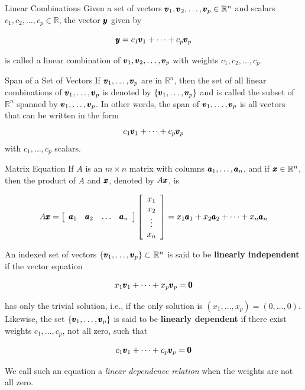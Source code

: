 \begin{definition}{Linear Combinations}
    Given a set of vectors $\pmb{v}_1, \pmb{v}_2, \ldots, \pmb{v}_p \in \mathbb{R}^n$ and scalars $c_1, c_2, \ldots, c_p \in \mathbb{R}$, the vector $\pmb{y}$ given by

\[
\pmb{y} = c_1 \pmb{v}_1 + \cdots + c_p \pmb{v}_p
\]

is called a linear combination of $\pmb{v}_1, \pmb{v}_2, \ldots, \pmb{v}_p$ with weights $c_1, c_2, \ldots, c_p$.

\end{definition}

\begin{definition}{Span of a Set of Vectors}
    If $\pmb{v}_1, \ldots, \pmb{v}_p$ are in $\mathbb{R}^n$, then the set of all linear combinations of $\pmb{v}_1, \ldots, \pmb{v}_p$ is denoted by  $\left\{\pmb{v}_1, \ldots, \pmb{v}_p\right\}$ and is called the subset of $\mathbb{R}^n$ spanned by $\pmb{v}_1, \ldots, \pmb{v}_p$. In other words, the span of $\pmb{v}_1, \ldots, \pmb{v}_p$ is all vectors that can be written in the form
    $$
    c_1 \pmb{v}_1 + \cdots + c_p \pmb{v}_p
    $$
    with $c_1, \ldots, c_p$ scalars.

\end{definition}

\begin{definition}{Matrix Equation}
  If $A$ is an $m \times n$ matrix with columns $\pmb{a}_1, \ldots, \pmb{a}_n$, and if $\pmb{x} \in \mathbb{R}^n$, then the product of $A$ and $\pmb{x}$, denoted by $A \pmb{x}$, is

\[
A \pmb{x} = \left[\begin{array}{llll}
\pmb{a}_1 & \pmb{a}_2 & \ldots & \pmb{a}_n
\end{array}\right] \left[\begin{array}{c}
x_1 \\
x_2 \\
\vdots \\
x_n
\end{array}\right] = x_1 \pmb{a}_1 + x_2 \pmb{a}_2 + \cdots + x_n \pmb{a}_n
\]
    
\end{definition}

\begin{definition}
    An indexed set of vectors $\left\{\pmb{v}_1, \ldots, \pmb{v}_p\right\} \subset \mathbb{R}^n$ is said to be \textbf{linearly independent} if the vector equation
    
    \[
    x_1 \pmb{v}_1 + \cdots + x_p \pmb{v}_p = \pmb{0}
    \]
    
    has only the trivial solution, i.e., if the only solution is $\left(x_1, \ldots, x_p\right) = (0, \ldots, 0)$. Likewise, the set $\left\{\pmb{v}_1, \ldots, \pmb{v}_p\right\}$ is said to be \textbf{linearly dependent} if there exist weights $c_1, \ldots, c_p$, not all zero, such that
    
    \[
    c_1 \pmb{v}_1 + \cdots + c_p \pmb{v}_p = \pmb{0}
    \]
    
    We call such an equation a \textit{linear dependence relation} when the weights are not all zero.
\end{definition}

